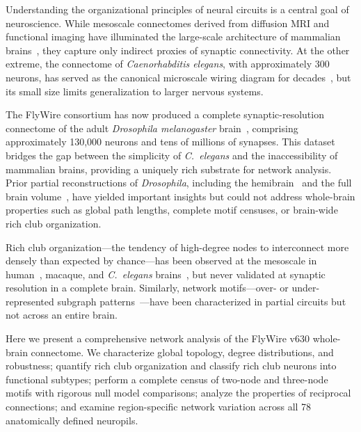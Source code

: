\documentclass[11pt]{article}
\begin{document}
Understanding the organizational principles of neural circuits is a central goal of neuroscience.  While mesoscale connectomes derived from diffusion MRI and functional imaging have illuminated the large-scale architecture of mammalian brains~\citep{sporns2005human,hagmann2008mapping,bullmore2009complex}, they capture only indirect proxies of synaptic connectivity.  At the other extreme, the connectome of \emph{Caenorhabditis elegans}, with approximately 300 neurons, has served as the canonical microscale wiring diagram for decades~\citep{white1986structure,cook2019connectome}, but its small size limits generalization to larger nervous systems.

The FlyWire consortium has now produced a complete synaptic-resolution connectome of the adult \emph{Drosophila melanogaster} brain~\citep{dorkenwald2024flywire,schlegel2024whole}, comprising approximately 130,000 neurons and tens of millions of synapses.  This dataset bridges the gap between the simplicity of \emph{C.\ elegans} and the inaccessibility of mammalian brains, providing a uniquely rich substrate for network analysis.  Prior partial reconstructions of \emph{Drosophila}, including the hemibrain~\citep{scheffer2020hemibrain} and the full brain volume~\citep{zheng2018complete}, have yielded important insights but could not address whole-brain properties such as global path lengths, complete motif censuses, or brain-wide rich club organization.

Rich club organization---the tendency of high-degree nodes to interconnect more densely than expected by chance---has been observed at the mesoscale in human~\citep{vandenHeuvel2011rich}, macaque, and \emph{C.\ elegans} brains~\citep{towlson2013rich}, but never validated at synaptic resolution in a complete brain.  Similarly, network motifs---over- or under-represented subgraph patterns~\citep{milo2002network,sporns2004motifs,alon2007network}---have been characterized in partial circuits but not across an entire brain.

Here we present a comprehensive network analysis of the FlyWire v630 whole-brain connectome.  We characterize global topology, degree distributions, and robustness; quantify rich club organization and classify rich club neurons into functional subtypes; perform a complete census of two-node and three-node motifs with rigorous null model comparisons; analyze the properties of reciprocal connections; and examine region-specific network variation across all 78 anatomically defined neuropils.

\end{document}
